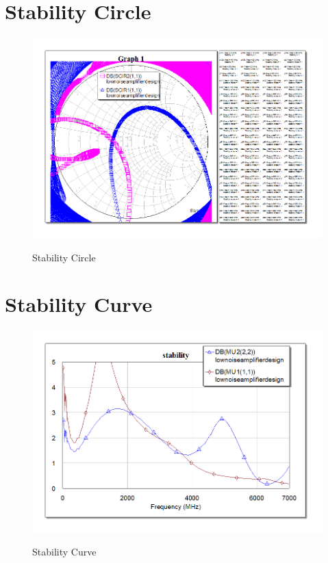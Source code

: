 \section{ Stability Circle} \label{ Stability Circle} 
\begin{figure}[H]
\centering
{\includegraphics[scale=0.5]{4.png}}
\caption{ Stability Circle }
\end{figure}

\section{ Stability Curve} \label{ Stability Curve } 
\begin{figure}[H]
\centering
{\includegraphics[scale=0.5]{3.png}}
\caption{ Stability Curve }
\end{figure}


